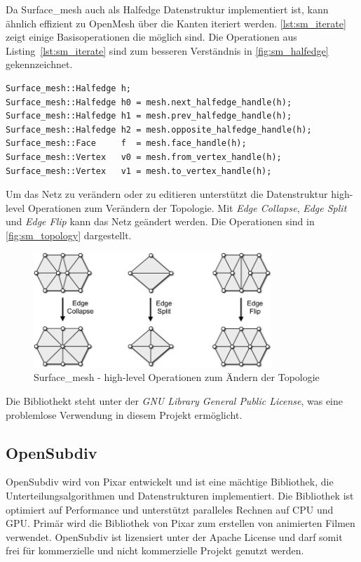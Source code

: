 Da Surface\_mesh auch als Halfedge Datenstruktur implementiert ist, kann ähnlich effizient zu OpenMesh über die Kanten iteriert werden.
\autoref{lst:sm_iterate} zeigt einige Basisoperationen die möglich sind.
Die Operationen aus Listing~\ref{lst:sm_iterate} sind zum besseren Verständnis in \autoref{fig:sm_halfedge} gekennzeichnet. 

\begin{lstlisting}[style=myCppStyle, caption=Surface\_mesh - Basisoperationen, label=lst:sm_iterate]
Surface_mesh::Halfedge h;
Surface_mesh::Halfedge h0 = mesh.next_halfedge_handle(h);
Surface_mesh::Halfedge h1 = mesh.prev_halfedge_handle(h);
Surface_mesh::Halfedge h2 = mesh.opposite_halfedge_handle(h);
Surface_mesh::Face     f  = mesh.face_handle(h);
Surface_mesh::Vertex   v0 = mesh.from_vertex_handle(h);
Surface_mesh::Vertex   v1 = mesh.to_vertex_handle(h);
\end{lstlisting}

Um das Netz zu verändern oder zu editieren unterstützt die Datenstruktur high-level Operationen zum Verändern der Topologie.
Mit \emph{Edge Collapse}, \emph{Edge Split} und \emph{Edge Flip} kann das Netz geändert werden.
Die Operationen sind in \autoref{fig:sm_topology} dargestellt. 

\begin{figure}
    \centering
  \includegraphics[width=0.8\textwidth]{content/media/sm_topology-changes}
  \caption{Surface\_mesh - high-level Operationen zum Ändern der Topologie \cite{OpenGP.24.07.2015}}
  \label{fig:sm_topology}
\end{figure}

Die Bibliothekt steht unter der \emph{GNU Library General Public License}, was eine problemlose Verwendung in diesem Projekt ermöglicht.

\subsection{OpenSubdiv}

OpenSubdiv wird von Pixar entwickelt und ist eine mächtige Bibliothek, die Unterteilungsalgorithmen und Datenstrukturen implementiert.
Die Bibliothek ist optimiert auf Performance und unterstützt paralleles Rechnen auf CPU und GPU.
Primär wird die Bibliothek von Pixar zum erstellen von animierten Filmen verwendet.
OpenSubdiv ist lizensiert unter der Apache License und darf somit frei für kommerzielle und nicht kommerzielle Projekt genutzt werden.

